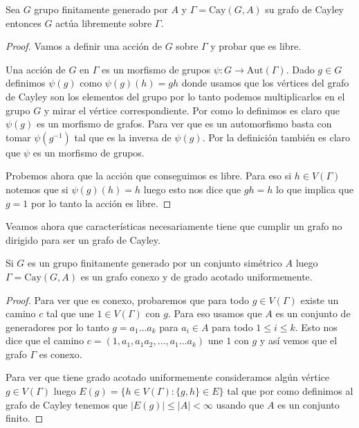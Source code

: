 \documentclass[tesis.tex]{subfiles}
\begin{document}
\begin{lema}
	Sea $G$ grupo finitamente generado por $A$ y $\Gamma = \text{Cay}(G,A)$ su grafo de Cayley entonces $G$ actúa libremente sobre $\Gamma$.
\end{lema}

\begin{proof}
	Vamos a definir una acción de $G$ sobre $\Gamma$ y probar que es libre.
	
	Una acción de $G$ en $\Gamma$ es un morfismo de grupos $\psi: G \to \text{Aut}(\Gamma)$.
	Dado $g \in G$ definimos $\psi(g)$ como $\psi(g)(h) = gh$ donde usamos que los vértices del grafo de Cayley son los elementos del grupo por lo tanto podemos multiplicarlos en el grupo $G$ y mirar el vértice correspondiente.
	Por como lo definimos es claro que $\psi(g)$ es un morfismo de grafos. 
	Para ver que es un automorfismo basta con tomar $\psi(g^{-1})$ tal que es la inversa de $\psi(g)$.
	Por la definición también es claro que $\psi$ es un morfismo de grupos.
	
	Probemos ahora que la acción que conseguimos es libre.
	Para eso si $h \in V(\Gamma)$ notemos que si $\psi(g)(h) = h$ luego esto nos dice que $gh = h$ lo que implica que $g = 1$ por lo tanto la acción es libre.
	
\end{proof}

Veamos ahora que características necesariamente tiene que cumplir un grafo no dirigido para ser un grafo de Cayley.

\begin{lema}\label{lema_cayley_conexo_grado}
	Si $G$ es un grupo finitamente generado por un conjunto simétrico $A$ luego $\Gamma = \text{Cay}(G,A)$ es un grafo conexo y de grado acotado uniformemente.
\end{lema}
\begin{proof}
	Para ver que es conexo,	probaremos que para todo $g \in V(\Gamma)$ existe un camino $c$ tal que une $1 \in V(\Gamma)$ con $g$.
	Para eso usamos que $A$ es un conjunto de generadores por lo tanto $g = a_{1} \dots a_{k}$ para $a_{i} \in A$ para todo $1 \le i \le k$.
	Esto nos dice que el camino $c = (1, a_{1}, a_{1}a_{2}, \dots, a_{1} \dots a_{k})$ une $1$ con $g$ y así vemos que el grafo $\Gamma$ es conexo. 
	
	Para ver que tiene grado acotado uniformemente consideramos algún vértice $g \in V(\Gamma)$ luego $E(g) = \{  h \in V(\Gamma) : \{g,h\} \in E \}$ tal que por como definimos al grafo de Cayley tenemos que $|E(g)| \le |A| < \infty$ usando que $A$ es un conjunto finito.
\end{proof}
\end{document}
